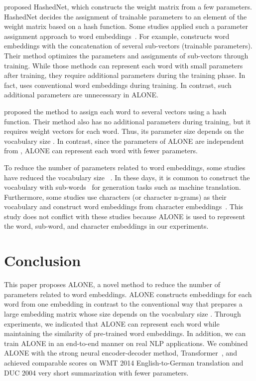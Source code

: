 \documentclass{article}
\begin{document}
\citet{Hashednet} proposed HashedNet, which constructs the weight matrix from a few parameters.
HashedNet decides the assignment of trainable parameters to an element of the weight matrix based on a hash function.
Some studies applied such a parameter assignment approach to word embeddings~\cite{Suzuki:Compress:Embed,Shu:coding,pmlr-v80-chen18g}.
For example, \citet{Suzuki:Compress:Embed} constructs word embeddings with the concatenation of several sub-vectors (trainable parameters).
Their method optimizes the parameters and assignments of sub-vectors through training.
While those methods can represent each word with small parameters after training, they require additional parameters during the training phase.
In fact, \citet{Suzuki:Compress:Embed} uses conventional word embeddings during training.
In contrast, such additional parameters are unnecessary in ALONE.

\citet{NIPS2017_7078} proposed the method to assign each word to several vectors using a hash function.
Their method also has no additional parameters during training, but it requires weight vectors for each word.
Thus, its parameter size depends on the vocabulary size .
In contrast, since the parameters of ALONE are independent from , ALONE can represent each word with fewer parameters.

To reduce the number of parameters related to word embeddings, some studies have reduced the vocabulary size ~\cite{Kim:2016:CNL:3016100.3016285,wieting-etal-2016-charagram,Takase:chara:ngram}.
In these days, it is common to construct the vocabulary with sub-words~\cite{sennrich-etal-2016-neural,kudo-2018-subword} for generation tasks such as machine translation.
Furthermore, some studies use characters (or character n-grams) as their vocabulary and construct word embeddings from character embeddings~\cite{Kim:2016:CNL:3016100.3016285,wieting-etal-2016-charagram,Takase:chara:ngram}.
This study does not conflict with these studies because ALONE is used to represent the word, sub-word, and character embeddings in our experiments.



\section{Conclusion}
This paper proposes ALONE, a novel method to reduce the number of parameters related to word embeddings.
ALONE constructs embeddings for each word from one embedding in contrast to the conventional way that prepares a large embedding matrix whose size depends on the vocabulary size .
Through experiments, we indicated that ALONE can represent each word while maintaining the similarity of pre-trained word embeddings.
In addition, we can train ALONE in an end-to-end manner on real NLP applications.
We combined ALONE with the strong neural encoder-decoder method, Transformer~\cite{NIPS2017_7181}, and achieved comparable scores on WMT 2014 English-to-German translation and DUC 2004 very short summarization with fewer parameters.
\end{document}
